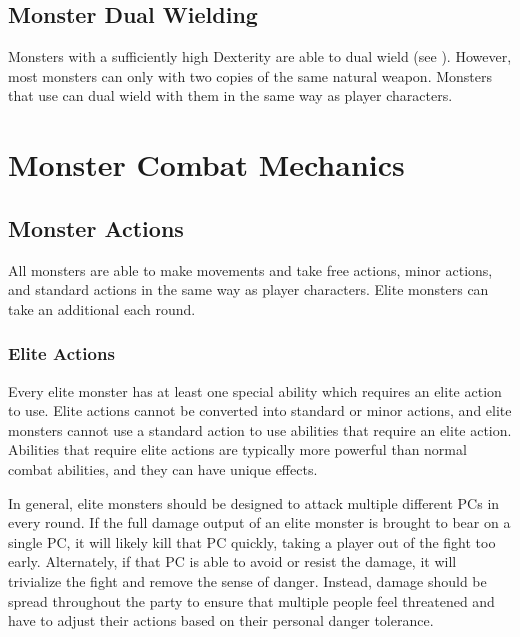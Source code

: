     \subsection{Monster Dual Wielding}\label{Monster Dual Wielding}
        Monsters with a sufficiently high Dexterity are able to dual wield (see ).
        However, most monsters can only  with two copies of the same  natural weapon.
        Monsters that use  can dual wield with them in the same way as player characters.

\section{Monster Combat Mechanics}

    \subsection{Monster Actions}\label{Monster Actions}
        All monsters are able to make movements and take free actions, minor actions, and standard actions in the same way as player characters.
        Elite monsters can take an additional  each round.

        \subsubsection{Elite Actions}\label{Elite Actions}
            Every elite monster has at least one special ability which requires an elite action to use.
            Elite actions cannot be converted into standard or minor actions, and elite monsters cannot use a standard action to use abilities that require an elite action.
            Abilities that require elite actions are typically more powerful than normal combat abilities, and they can have unique effects.

            In general, elite monsters should be designed to attack multiple different PCs in every round.
            If the full damage output of an elite monster is brought to bear on a single PC, it will likely kill that PC quickly, taking a player out of the fight too early.
            Alternately, if that PC is able to avoid or resist the damage, it will trivialize the fight and remove the sense of danger.
            Instead, damage should be spread throughout the party to ensure that multiple people feel threatened and have to adjust their actions based on their personal danger tolerance.


